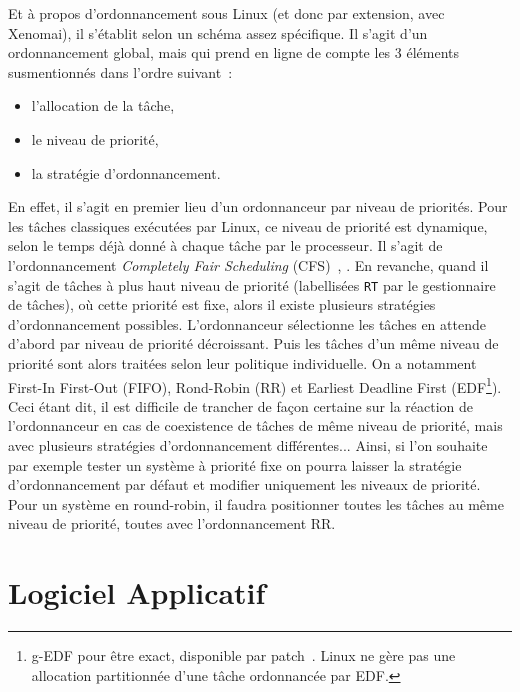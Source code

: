 \documentclass[french, a4paper, 11pt, twoside, pdftex]{StyleThese}
\begin{document}
        Et à propos d'ordonnancement sous Linux (et donc par extension, avec Xenomai), il s'établit selon un schéma assez spécifique\cite{ishkov_complete_2015}. Il s'agit d'un ordonnancement global, mais qui prend en ligne de compte les 3 éléments susmentionnés dans l'ordre suivant~:
        \begin{itemize}
        	\item l'allocation de la tâche,
        	\item le niveau de priorité,
        	\item la stratégie d'ordonnancement.
        \end{itemize}
    	En effet, il s'agit en premier lieu d'un ordonnanceur par niveau de priorités. Pour les tâches classiques exécutées par Linux, ce niveau de priorité est dynamique, selon le temps déjà donné à chaque tâche par le processeur. Il s'agit de l'ordonnancement \textit{Completely Fair Scheduling} (CFS)~\cite{wong_towards_2008}, \cite{pabla_completely_2009}. En revanche, quand il s'agit de tâches à plus haut niveau de priorité (labellisées \texttt{RT} par le gestionnaire de tâches), où cette priorité est fixe, alors il existe plusieurs stratégies d'ordonnancement possibles. L'ordonnanceur sélectionne les tâches en attende d'abord par niveau de priorité décroissant. Puis les tâches d'un même niveau de priorité sont alors traitées selon leur politique individuelle. On a notamment First-In First-Out (FIFO), Rond-Robin (RR) et Earliest Deadline First (EDF\footnote{g-EDF pour être exact, disponible par patch~\cite{lelli_efficient_2011}. Linux ne gère pas une allocation partitionnée d'une tâche ordonnancée par EDF.}). Ceci étant dit, il est difficile de trancher de façon certaine sur la réaction de l'ordonnanceur en cas de coexistence de tâches de même niveau de priorité, mais avec plusieurs stratégies d'ordonnancement différentes...
    	Ainsi, si l'on souhaite par exemple tester un système à priorité fixe on pourra laisser la stratégie d'ordonnancement par défaut et modifier uniquement les niveaux de priorité. Pour un système en round-robin, il faudra positionner toutes les tâches au même niveau de priorité, toutes avec l'ordonnancement RR.

                        
    \section{Logiciel Applicatif}
\end{document}
